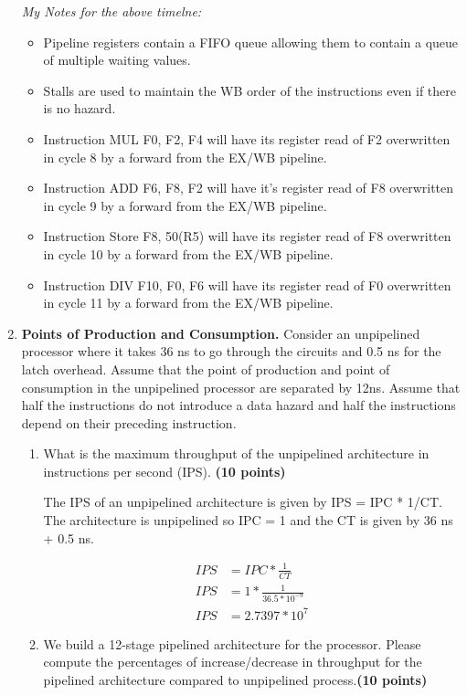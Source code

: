 \documentclass[a4paper, 11pt]{exam}
\begin{document}
\begin{center}
\begin{enumerate}
\textit{My Notes for the above timelne:}
%
\begin{itemize}
	\item Pipeline registers contain a FIFO queue allowing them to contain a queue of multiple waiting values.
	\item Stalls are used to maintain the WB order of the instructions even if there is no hazard.
	\item Instruction MUL F0, F2, F4 will have its register read of F2 overwritten in cycle 8 by a forward from the EX/WB pipeline. 
	\item Instruction ADD F6, F8, F2 will have it's register read of F8 overwritten in cycle 9 by a forward from the EX/WB pipeline.
	\item Instruction Store F8, 50(R5) will have its register read of F8 overwritten in cycle 10 by a forward from the EX/WB pipeline.
	\item Instruction DIV F10, F0, F6 will have its register read of F0 overwritten in cycle 11 by a forward from the EX/WB pipeline.
\end{itemize}

\item \textbf{Points of Production and Consumption.}
Consider an unpipelined processor where it takes 36 ns to go through the circuits and 0.5 ns for the latch overhead. Assume that the point of production and point of consumption in the unpipelined processor are separated by 12ns. Assume that half the instructions do not introduce a data hazard and half the instructions depend on their preceding instruction.

\begin{enumerate}
\item What is the maximum throughput of the unpipelined architecture in instructions per second (IPS). \textbf{(10 points)} \\

\hfill
 
The IPS of an unpipelined architecture is given by IPS = IPC * 1/CT. The architecture is unpipelined so IPC = 1 and the CT is given by 36 ns + 0.5 ns.

\begin{align*} 
	IPS &= IPC * \frac{1}{CT} \\
	IPS &= 1 * \frac{1}{36.5 * 10^{-9}}\\
	IPS &= 2.7397 * 10^7
\end{align*}

\item We build a 12-stage pipelined architecture for the processor. Please compute the percentages of increase/decrease in throughput for the pipelined architecture compared to unpipelined process.\textbf {(10 points)}


\end{enumerate}
\end{enumerate}
\end{center}
\end{document}

